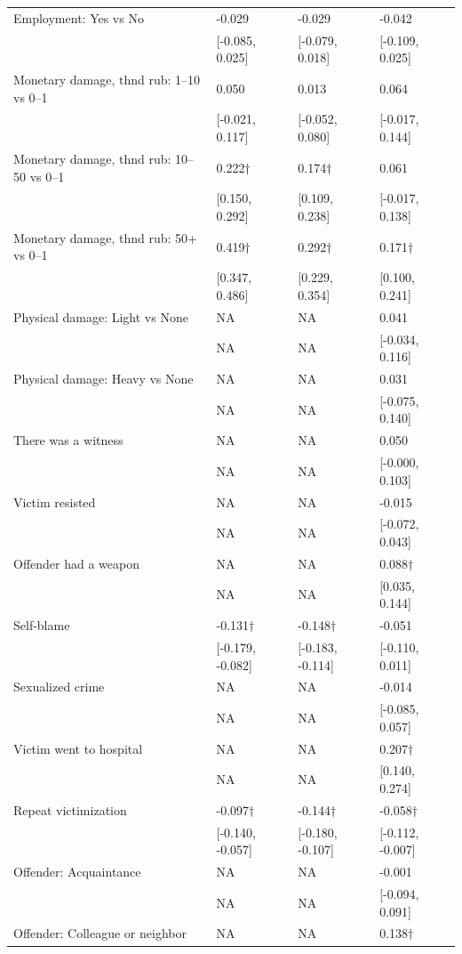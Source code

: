 \begin{tabular}[t]{llll}
Employment: Yes vs No & -0.029 & -0.029 & -0.042\\
 & {}[-0.085, 0.025] & {}[-0.079, 0.018] & {}[-0.109, 0.025]\\
Monetary damage, thnd rub:  1–10 vs 0–1 & 0.050 & 0.013 & 0.064\\
 & {}[-0.021, 0.117] & {}[-0.052, 0.080] & {}[-0.017, 0.144]\\
Monetary damage, thnd rub:  10–50 vs 0–1 & 0.222$\dagger$ & 0.174$\dagger$ & 0.061\\
 & {}[0.150, 0.292] & {}[0.109, 0.238] & {}[-0.017, 0.138]\\
Monetary damage, thnd rub:  50+ vs 0–1 & 0.419$\dagger$ & 0.292$\dagger$ & 0.171$\dagger$\\
 & {}[0.347, 0.486] & {}[0.229, 0.354] & {}[0.100, 0.241]\\
Physical damage: Light vs None & NA & NA & 0.041\\
 & NA & NA & {}[-0.034, 0.116]\\
Physical damage: Heavy vs None & NA & NA & 0.031\\
 & NA & NA & {}[-0.075, 0.140]\\
There was a witness & NA & NA & 0.050\\
 & NA & NA & {}[-0.000, 0.103]\\
Victim resisted & NA & NA & -0.015\\
 & NA & NA & {}[-0.072, 0.043]\\
Offender had a weapon & NA & NA & 0.088$\dagger$\\
 & NA & NA & {}[0.035, 0.144]\\
Self-blame & -0.131$\dagger$ & -0.148$\dagger$ & -0.051\\
 & {}[-0.179, -0.082] & {}[-0.183, -0.114] & {}[-0.110, 0.011]\\
Sexualized crime & NA & NA & -0.014\\
 & NA & NA & {}[-0.085, 0.057]\\
Victim went to hospital & NA & NA & 0.207$\dagger$\\
 & NA & NA & {}[0.140, 0.274]\\
Repeat victimization & -0.097$\dagger$ & -0.144$\dagger$ & -0.058$\dagger$\\
 & {}[-0.140, -0.057] & {}[-0.180, -0.107] & {}[-0.112, -0.007]\\
Offender: Acquaintance & NA & NA & -0.001\\
 & NA & NA & {}[-0.094, 0.091]\\
Offender: Colleague or neighbor & NA & NA & 0.138$\dagger$\\

\end{tabular}
